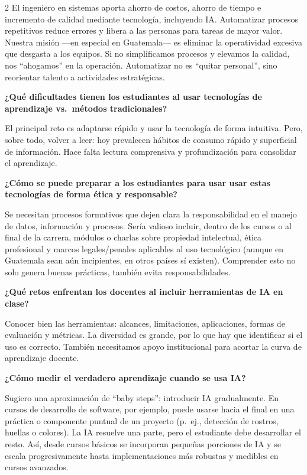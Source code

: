 \documentclass[12pt,spanish,Letterpaper,openany]{book}
\begin{document}
\begin {multicols}{2}
El ingeniero en sistemas aporta ahorro de costos, ahorro de tiempo e incremento de calidad mediante tecnología, incluyendo IA. Automatizar procesos repetitivos reduce errores y libera a las personas para tareas de mayor valor. Nuestra misión ---en especial en Guatemala--- es eliminar la operatividad excesiva que desgasta a los equipos. Si no simplificamos procesos y elevamos la calidad, nos ``ahogamos'' en la operación. Automatizar no es ``quitar personal'', sino reorientar talento a actividades estratégicas.

\textbf{¿Qué dificultades tienen los estudiantes al usar tecnologías de aprendizaje vs.~métodos tradicionales?}

El principal reto es adaptarse rápido y usar la tecnología de forma intuitiva. Pero, sobre todo, volver a leer: hoy prevalecen hábitos de consumo rápido y superficial de información. Hace falta lectura comprensiva y profundización para consolidar el aprendizaje.

\textbf{¿Cómo se puede preparar a los estudiantes para usar usar estas tecnologías de forma ética y responsable?}

Se necesitan procesos formativos que dejen clara la responsabilidad en el manejo de datos, información y procesos. Sería valioso incluir, dentro de los cursos o al final de la carrera, módulos o charlas sobre propiedad intelectual, ética profesional y marcos legales/penales aplicables al uso tecnológico (aunque en Guatemala sean aún incipientes, en otros países sí existen). Comprender esto no solo genera buenas prácticas, también evita responsabilidades.

\textbf{¿Qué retos enfrentan los docentes al incluir herramientas de IA en clase?}

Conocer bien las herramientas: alcances, limitaciones, aplicaciones, formas de evaluación y métricas. La diversidad es grande, por lo que hay que identificar si el uso es correcto. También necesitamos apoyo institucional para acortar la curva de aprendizaje docente.

\textbf{¿Cómo medir el verdadero aprendizaje cuando se usa IA?}

Sugiero una aproximación de ``baby steps'': introducir IA gradualmente. En cursos de desarrollo de software, por ejemplo, puede usarse hacia el final en una práctica o componente puntual de un proyecto (p.~ej., detección de rostros, huellas o colores). La IA resuelve una parte, pero el estudiante debe desarrollar el resto. Así, desde cursos básicos se incorporan pequeñas porciones de IA y se escala progresivamente hasta implementaciones más robustas y medibles en cursos avanzados.


\end{multicols}
\end{document}
